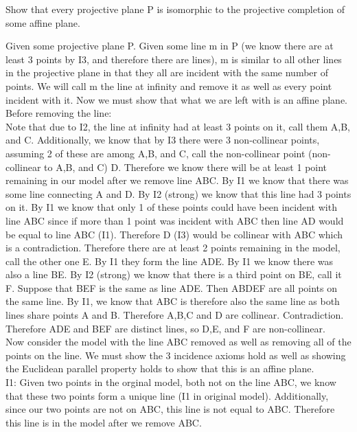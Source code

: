 \documentclass[12pt,letterpaper]{article}
\newcommand{\prob}[1]{\newpage\noindent {\bf #1}}
\begin{document}
\prob{Major exercise 2}  Show that every projective plane P is isomorphic to the projective completion of some affine plane. 



Given some projective plane P.  Given some line m in P (we know there are at least 3 points by I3, and therefore there are lines), m is similar to all other lines in the projective plane in that they all are incident with the same number of points.  We will call m the line at infinity and remove it as well as every point incident with it.  Now we must show that what we are left with is an affine plane.  \\

\noindent Before removing the line:\\

Note that due to I2, the line at infinity had at least 3 points on it, call them A,B, and C.  Additionally, we know that by I3 there were 3 non-collinear points, assuming 2 of these are among A,B, and C, call the non-collinear point (non-collinear to A,B, and C) D.  Therefore we know there will be at least 1 point remaining in our model after we remove line ABC.  By I1 we know that there was some line connecting A and D.  By I2 (strong) we know that this line had 3 points on it.  By I1 we know that only 1 of these points could have been incident with line ABC since if more than 1 point was incident with ABC then line AD would be equal to line ABC (I1).  Therefore D (I3) would be collinear with ABC which is a contradiction.  Therefore there are at least 2 points remaining in the model, call the other one E.  By I1 they form the line ADE.  By I1 we know there was also a line BE.  By I2 (strong) we know that there is a third point on BE, call it F.  Suppose that BEF is the same as line ADE.  Then ABDEF are all points on the same line.  By I1, we know that ABC is therefore also the same line as both lines share points A and B.  Therefore A,B,C and D are collinear. Contradiction.  Therefore ADE and BEF are distinct lines, so D,E, and F are non-collinear.  \\

Now consider the model with the line ABC removed as well as removing all of the points on the line.  We must show the 3 incidence axioms hold as well as showing the Euclidean parallel property holds to show that this is an affine plane. \\

I1: Given two points in the orginal model, both not on the line ABC, we know that these two points form a unique line (I1 in original model).  Additionally, since our two points are not on ABC, this line is not equal to ABC.  Therefore this line is in the model after we remove ABC.\\
\end{document}
